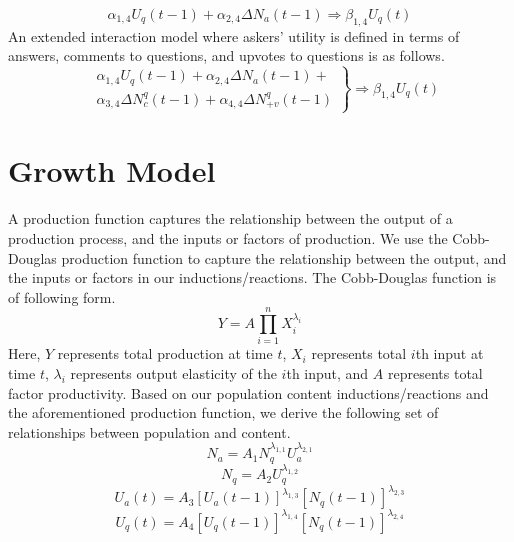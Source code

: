 \begin{equation*}
\alpha_{1, 4} U_q(t-1) + \alpha_{2, 4} \Delta N_a(t-1) \Longrightarrow \beta_{1, 4} U_q(t)
\end{equation*}
\noindent An extended interaction model where askers' utility is defined in terms of answers, comments to questions, and upvotes to questions is as follows.
\begin{equation*}
\left.
\begin{aligned}
& \alpha_{1, 4} U_q(t-1) + \alpha_{2, 4} \Delta N_a(t-1) +\\
& \alpha_{3, 4} \Delta N_c^q(t-1) + \alpha_{4, 4} \Delta N_{+v}^q(t-1)
\end{aligned}
\right\}
\Longrightarrow \beta_{1, 4} U_q(t)
\end{equation*}

\section{Growth Model}
A production function captures the relationship between the output of a production process, and the inputs or factors of production. We use the Cobb-Douglas production function to capture the relationship between the output, and the inputs or factors in our inductions/reactions. The Cobb-Douglas function is of following form.
\begin{equation*}
Y = A\prod_{i=1}^{n} X_i^{\lambda_i}
\end{equation*}
\noindent Here, $Y$ represents total production at time $t$, $X_i$ represents total $i$th input at time $t$, $\lambda_i$ represents output elasticity of the $i$th input, and $A$ represents total factor productivity. Based on our population content inductions/reactions and the aforementioned production function, we derive the following set of relationships between population and content.
\begin{equation}
N_a = A_1 N_q^{\lambda_{1, 1}} U_a^{\lambda_{2, 1}}
\end{equation}
\begin{equation}
N_q = A_2 U_q^{\lambda_{1, 2}}
\end{equation}
\begin{equation}
U_a(t) = A_3 [U_a(t-1)]^{\lambda_{1, 3}} [N_q(t-1)]^{\lambda_{2, 3}}
\end{equation}
\begin{equation}
U_q(t) = A_4 [U_q(t-1)]^{\lambda_{1, 4}} [N_q(t-1)]^{\lambda_{2, 4}}
\end{equation}
